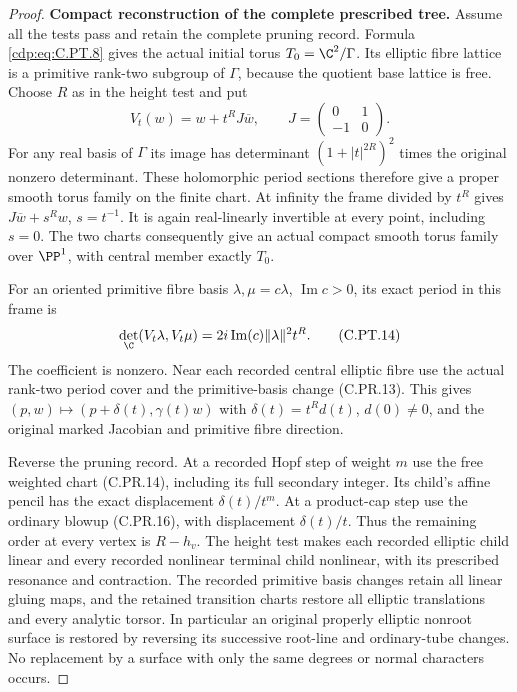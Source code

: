 \begin{proof}
\par\medskip\noindent\textbf{Compact reconstruction of the complete prescribed tree.}
Assume all the tests pass and retain the
complete pruning record. Formula \eqref{cdp:eq:C.PT.8}
gives the actual initial torus
$T_0=\C^2/\Gamma$. Its elliptic fibre
lattice is a primitive rank-two subgroup
of $\Gamma$, because the quotient base
lattice is free. Choose $R$ as in the
height test and put
\[
 V_t(w)=w+t^R J\overline w,\qquad
              J=\begin{pmatrix}0&1\\-1&0\end{pmatrix}.
 \tag{C.PT.13}\label{cdp:eq:C.PT.13}
\]
For any real basis of $\Gamma$ its image
has determinant $(1+|t|^{2R})^2$ times
the original nonzero determinant.
These holomorphic period sections
therefore give a proper smooth torus
family on the finite chart. At infinity
the frame divided by $t^R$ gives
$J\overline w+s^Rw$, $s=t^{-1}$.
It is again real-linearly invertible
at every point, including $s=0$.
The two charts consequently give an
actual compact smooth torus family
over $\PP^1$, with central member
exactly $T_0$.

For an oriented primitive fibre basis
$\lambda,\mu=c\lambda$,
$\operatorname{Im}c>0$, its exact period
in this frame is
\[
 \det_{\C}(V_t\lambda,V_t\mu)
       =2i\operatorname{Im}(c)\|\lambda\|^2t^R.
 \tag{C.PT.14}\label{cdp:eq:C.PT.14}
\]
The coefficient is nonzero. Near each
recorded central elliptic fibre use
the actual rank-two period cover and
the primitive-basis change (C.PR.13).
This gives
$(p,w)\mapsto(p+\delta(t),\gamma(t)w)$
with $\delta(t)=t^R d(t)$, $d(0)\ne0$,
and the original marked Jacobian and
primitive fibre direction.

Reverse the pruning record. At a
recorded Hopf step of weight $m$ use
the free weighted chart (C.PR.14),
including its full secondary integer.
Its child's affine pencil has the
exact displacement $\delta(t)/t^m$.
At a product-cap step use the ordinary
blowup (C.PR.16), with displacement
$\delta(t)/t$. Thus the remaining
order at every vertex is $R-h_v$.
The height test makes each recorded
elliptic child linear and every
recorded nonlinear terminal child
nonlinear, with its prescribed
resonance and contraction. The
recorded primitive basis changes
retain all linear gluing maps,
and the retained transition charts
restore all elliptic translations
and every analytic torsor. In particular an
original properly elliptic nonroot surface
is restored by reversing its successive
root-line and ordinary-tube changes. No
replacement by a surface with only the same
degrees or normal characters occurs.


\end{proof}
